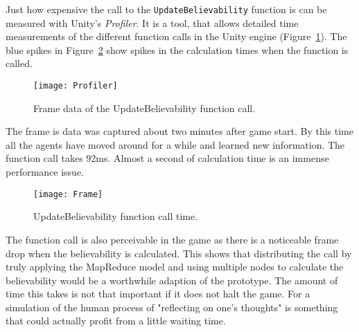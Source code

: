 Just how expensive the call to the \verb|UpdateBelievability| function is can be measured with Unity's \textit{Profiler}. It is a tool, that allows detailed time measurements of the different function calls in the Unity engine (Figure~\ref{fig:profiler}). The blue spikes in Figure~\ref{fig:frame} show spikes in the calculation times when the function is called.
\begin{figure}
	\centering
	\texttt{[image: Profiler]}
	\caption{Frame data of the UpdateBelievability function call.}
	\label{fig:profiler}
\end{figure}
The frame is data was captured about two minutes after game start. By this time all the agents have moved around for a while and learned new information. The function call takes 92ms. Almost a second of calculation time is an immense performance issue.
\begin{figure}
	\centering
	\texttt{[image: Frame]}
	\caption{UpdateBelievability function call time.}
	\label{fig:frame}
\end{figure}
The function call is also perceivable in the game as there is a noticeable frame drop when the believability is calculated. This shows that distributing the call by truly applying the MapReduce model and using multiple nodes to calculate the believability would be a worthwhile adaption of the prototype. The amount of time this takes is not that important if it does not halt the game. For a simulation of the human process of "reflecting on one's thoughts" is something that could actually profit from a little waiting time.
